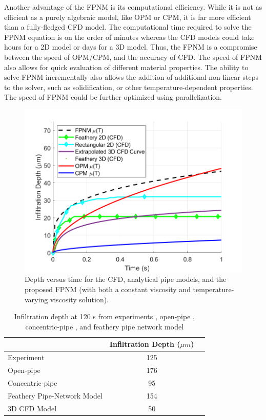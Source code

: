 \documentclass[%
 aip,
 amsmath,amssymb,
 reprint,%
floatfix]{revtex4-1}
\begin{document}
Another advantage of the FPNM is its computational efficiency. While it is not as efficient as a purely algebraic model, like OPM or CPM, it is far more efficient than a fully-fledged CFD model. The computational time required to solve the FPNM equation is on the order of minutes whereas the CFD models could take hours for a 2D model or days for a 3D model. Thus, the FPNM is a compromise between the speed of OPM/CPM, and the accuracy of CFD. The speed of FPNM also allows for quick evaluation of different material properties. The ability to solve FPNM incrementally also allows the addition of additional non-linear steps to the solver, such as solidification, or other temperature-dependent properties. The speed of FPNM could be further optimized using parallelization. 




\begin{figure}
    \centering
    \includegraphics[width=\linewidth]{Figures/analytical.png}
    \caption{Depth versus time for the CFD, analytical pipe models, and the proposed FPNM (with both a constant viscosity and temperature-varying viscosity solution).}
    \label{fig:pipeNetworkResults}
\end{figure}

\begin{table}
\caption{\label{tab:resultsCompare} Infiltration depth at 120 s from experiments \cite{Naraparaju2019}, open-pipe \cite{Naraparaju2019}, concentric-pipe \cite{Naraparaju2019}, and feathery pipe network model}
\centering
\begin{ruledtabular}
\begin{tabular}{lcc}
 & Infiltration Depth ($\mu m$)\\
\hline
Experiment & 125\\
Open-pipe & 176\\
Concentric-pipe & 95\\
Feathery Pipe-Network Model & 154\\
3D CFD Model & 50
\end{tabular}
\end{ruledtabular}
\end{table}
\end{document}
